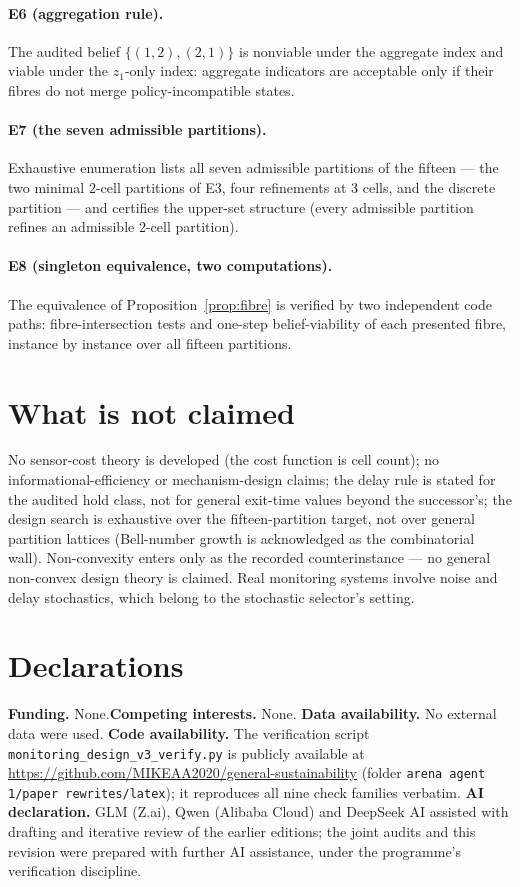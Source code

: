 \documentclass[10pt,twocolumn]{article}
\theoremstyle{definition}
\begin{document}
\paragraph{E6 (aggregation rule).} The audited belief
$\{(1,2),(2,1)\}$ is nonviable under the aggregate index and viable under
the $z_1$-only index: aggregate indicators are acceptable only if their
fibres do not merge policy-incompatible states.

\paragraph{E7 (the seven admissible partitions).} Exhaustive enumeration
lists all seven admissible partitions of the fifteen --- the two minimal
$2$-cell partitions of E3, four refinements at $3$ cells, and the discrete
partition --- and certifies the upper-set structure (every admissible
partition refines an admissible $2$-cell partition).

\paragraph{E8 (singleton equivalence, two computations).} The equivalence
of Proposition~\ref{prop:fibre} is verified by two independent code paths:
fibre-intersection tests and one-step belief-viability of each presented
fibre, instance by instance over all fifteen partitions.

\section{What is not claimed}

No sensor-cost theory is developed (the cost function is cell count); no
informational-efficiency or mechanism-design claims; the delay rule is
stated for the audited hold class, not for general exit-time values
beyond the successor's; the design search is exhaustive over the
fifteen-partition target, not over general partition lattices (Bell-number
growth is acknowledged as the combinatorial wall). Non-convexity enters
only as the recorded counterinstance --- no general non-convex design
theory is claimed. Real monitoring systems involve noise and delay
stochastics, which belong to the stochastic selector's setting.


\section*{Declarations}
\textbf{Funding.} None.\quad \textbf{Competing interests.} None.\quad
\textbf{Data availability.} No external data were used.\quad
\textbf{Code availability.} The verification script
\texttt{monitoring\_design\_v3\_verify.py} is publicly available at
\url{https://github.com/MIKEAA2020/general-sustainability} (folder
\texttt{arena agent 1/paper rewrites/latex}); it reproduces all nine check
families verbatim.\quad
\textbf{AI declaration.} GLM (Z.ai), Qwen (Alibaba Cloud) and DeepSeek AI
assisted with drafting and iterative review of the earlier editions; the
joint audits and this revision were prepared with further AI assistance,
under the programme's verification discipline.
\end{document}
